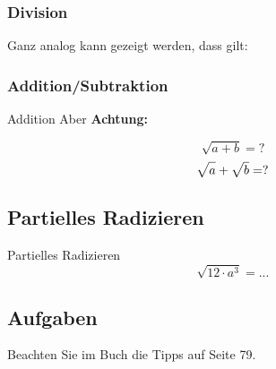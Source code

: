 \subsubsection{Division}
Ganz analog kann gezeigt werden, dass gilt: 


\subsubsection{Addition/Subtraktion}
\begin{bemerkung}{Addition}{}
  Aber \textbf{Achtung:}
  
$$\sqrt{a+b} = ?$$
  $$\sqrt{a\mathstrut{}} + \sqrt{b\mathstrut{}} = ?$$
\end{bemerkung}

\newpage

\subsection{Partielles Radizieren}

\begin{beispiel}{Partielles
Radizieren}{}
  $$\sqrt{12\cdot{} a^3} = ...$$

\end{beispiel}


\subsection*{Aufgaben}

Beachten Sie im Buch die Tipps auf Seite 79.

\newpage
